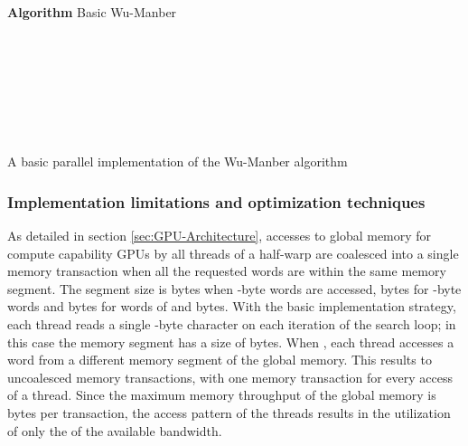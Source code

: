 \documentclass{ws-ijait}
\begin{document}
\begin{algorithm}[h]

\textbf{Algorithm} Basic Wu-Manber\\

\\
\\
\\


\\

\While{ } {

	\\
	
	\uIf {  } {
		\\
	}
}

\caption{A basic parallel implementation of the Wu-Manber algorithm}
\label{compl:cuda_WM_basic_implementation}
\end{algorithm}


\subsubsection{Implementation limitations and optimization techniques}
\label{subsec:implementation-limitations-optimizations}

As detailed in section \ref{sec:GPU-Architecture}, accesses to global memory for compute capability  GPUs by all threads of a half-warp are coalesced into a single memory transaction when all the requested words are within the same memory segment. The segment size is  bytes when -byte words are accessed,  bytes for -byte words and  bytes for words of  and  bytes. With the basic implementation strategy, each thread reads a single -byte character on each iteration of the search loop; in this case the memory segment has a size of  bytes. When , each thread accesses a word from a different memory segment of the global memory. This results to uncoalesced memory transactions, with one memory transaction for every access of a thread. Since the maximum memory throughput of the global memory is  bytes per transaction, the access pattern of the threads results in the utilization of only the  of the available bandwidth.
\end{document}
